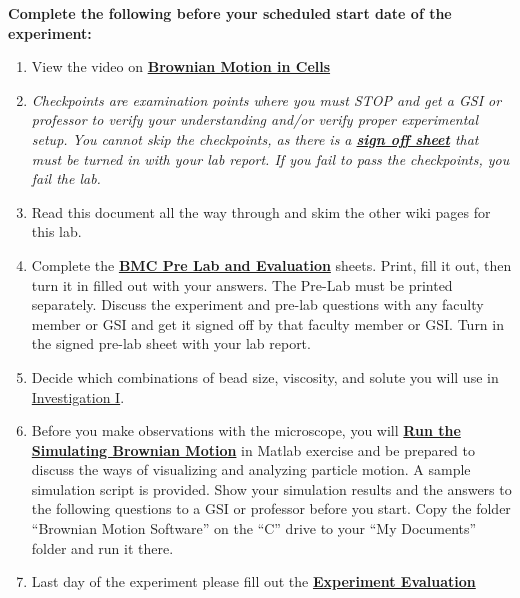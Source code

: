 \documentclass{../lab}
\begin{document}
\textbf{Complete the following before your scheduled start date of the experiment:}

\begin{enumerate}
    \item View the video on \href{http://youtu.be/XJ6YBTL6euc}{\textbf{Brownian Motion in Cells}}

    \item \emph{Checkpoints are examination points where you must STOP and get a GSI or professor to verify your understanding and/or verify proper experimental setup. You cannot skip the checkpoints, as there is a \href{http://experimentationlab.berkeley.edu/bmccheckpoints}{\textbf{sign off sheet}} that must be turned in with your lab report. If you fail to pass the checkpoints, you fail the lab.}

    \item Read this document all the way through and skim the other wiki pages for this lab.

    \item Complete the \href{http://experimentationlab.berkeley.edu/BMCPreLab}{\textbf{BMC Pre Lab and Evaluation}} sheets. Print, fill it out, then turn it in filled out with your answers. The Pre-Lab must be printed separately. Discuss the experiment and pre-lab questions with any faculty member or GSI and get it signed off by that faculty member or GSI. Turn in the signed pre-lab sheet with your lab report.

    \item Decide which combinations of bead size, viscosity, and solute you will use in  \hyperref[sec:InvestigationI]{Investigation I}.

    \item Before you make observations with the microscope, you will \href{http://experimentationlab.berkeley.edu/node/83}{\textbf{Run the Simulating Brownian Motion}} in Matlab exercise and be prepared to discuss the ways of visualizing and analyzing particle motion.  A sample simulation script is provided. Show your simulation results and the answers to the following questions to a GSI or professor before you start. Copy the folder ``Brownian Motion Software'' on the ``C'' drive to your ``My Documents'' folder and run it there.

    \item Last day of the experiment please fill out the \href{\ExperimentEvaluation}{\textbf{Experiment Evaluation}}
\end{enumerate}
\end{document}
